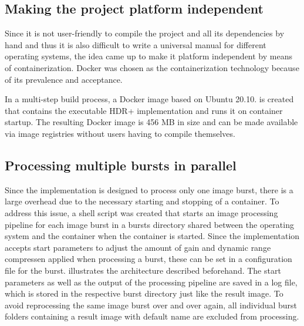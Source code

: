 \documentclass{egpubl}
\begin{document}
\subsection{Making the project platform independent}
\label{sec:resolving}

Since it is not user-friendly to compile the project and all its dependencies by hand and thus it 
is also difficult to write a universal manual for different operating systems, the idea came up to 
make it platform independent by means of containerization. Docker was chosen as the containerization 
technology because of its prevalence and acceptance. 

In a multi-step build process, a Docker image based on Ubuntu 20.10. is created that contains the 
executable HDR+ implementation and runs it on container startup. The resulting Docker image is 
456 MB in size and can be made available via image registries without users having to compile themselves.

\subsection{Processing multiple bursts in parallel}
\label{sec:parallel}

Since the implementation is designed to process only one image burst, there is a large overhead 
due to the necessary starting and stopping of a container. To address this issue, a shell script 
was created that starts an image processing pipeline for each image burst in a bursts directory 
shared between the operating system and the container when the container is started. Since the 
implementation accepts start parameters to adjust the amount of gain and dynamic range compressen 
applied when processing a burst, these can be set in a configuration 
file for the burst.  illustrates the architecture described beforehand. 
The start parameters as well as the output of the processing pipeline are saved 
in a log file, which is stored in the respective burst directory just like the result image.
To avoid reprocessing the same image burst over and over again, all individual burst folders containing 
a result image with default name are excluded from processing. 
\end{document}
